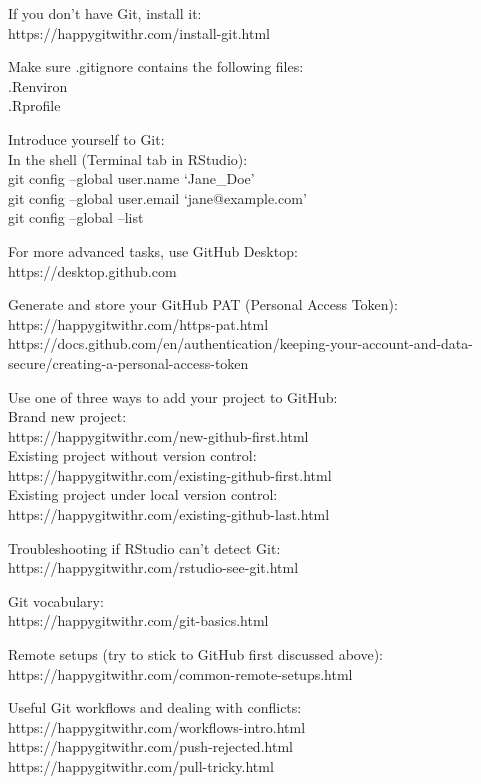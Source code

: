 \documentclass[
  letterpaper,
  DIV=11,
  numbers=noendperiod]{scrreport}
\begin{document}
If you don't have Git, install it:\\
https://happygitwithr.com/install-git.html

Make sure .gitignore contains the following files:\\
.Renviron\\
.Rprofile

Introduce yourself to Git:\\
In the shell (Terminal tab in RStudio):\\
git config --global user.name `Jane\_Doe'\\
git config --global user.email `jane@example.com'\\
git config --global --list

For more advanced tasks, use GitHub Desktop:\\
https://desktop.github.com

Generate and store your GitHub PAT (Personal Access Token):\\
https://happygitwithr.com/https-pat.html\\
https://docs.github.com/en/authentication/keeping-your-account-and-data-secure/creating-a-personal-access-token

Use one of three ways to add your project to GitHub:\\
Brand new project:\\
https://happygitwithr.com/new-github-first.html\\
Existing project without version control:\\
https://happygitwithr.com/existing-github-first.html\\
Existing project under local version control:\\
https://happygitwithr.com/existing-github-last.html

Troubleshooting if RStudio can't detect Git:\\
https://happygitwithr.com/rstudio-see-git.html

Git vocabulary:\\
https://happygitwithr.com/git-basics.html

Remote setups (try to stick to GitHub first discussed above):\\
https://happygitwithr.com/common-remote-setups.html

Useful Git workflows and dealing with conflicts:\\
https://happygitwithr.com/workflows-intro.html\\
https://happygitwithr.com/push-rejected.html\\
https://happygitwithr.com/pull-tricky.html
\end{document}
